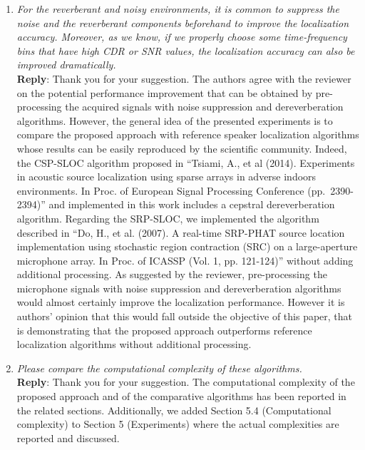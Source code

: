 \documentclass[11pt, technote, letterpaper, oneside, onecolumn]{IEEEtran}
\begin{document}
\begin{enumerate}
\item  \textit{For the reverberant and noisy environments, it is common to suppress the noise and the reverberant components beforehand to improve the localization accuracy. Moreover, as we know, if we properly choose some time-frequency bins that have high CDR or SNR values, the localization accuracy can also be improved dramatically.\\}
\textbf{Reply}: Thank you for your suggestion. The authors agree with the reviewer on the potential performance improvement that can be obtained by pre-processing the acquired signals with noise suppression and dereverberation algorithms. However, the general idea of the presented experiments is to compare the proposed approach with reference speaker localization algorithms whose results can be easily reproduced by the scientific community. Indeed, the CSP-SLOC algorithm proposed in  ``Tsiami, A., et al (2014). Experiments in acoustic source localization using sparse arrays in adverse indoors environments. In Proc. of European Signal Processing Conference (pp.\ 2390-2394)'' and implemented in this work includes a cepstral dereverberation algorithm. Regarding the SRP-SLOC, we implemented the algorithm described in ``Do, H., et al. (2007). A real-time SRP-PHAT source location implementation using stochastic region contraction (SRC) on a large-aperture microphone array. In Proc. of ICASSP (Vol. 1, pp. 121-124)'' without adding additional processing. As suggested by the reviewer, pre-processing the microphone signals with noise suppression and dereverberation algorithms would almost certainly improve the localization performance. However it is authors' opinion that this would fall outside the objective of this paper, that is demonstrating that the proposed approach outperforms reference localization algorithms without additional processing.  %


\item  \textit{Please compare the computational complexity of these algorithms.\\}
\textbf{Reply}: Thank you for your suggestion. The computational complexity of the proposed approach and of the comparative algorithms has been reported in the related sections. Additionally, we added Section 5.4 (Computational complexity) to Section 5 (Experiments) where the actual complexities are reported and discussed.

\end{enumerate}
\end{document}
